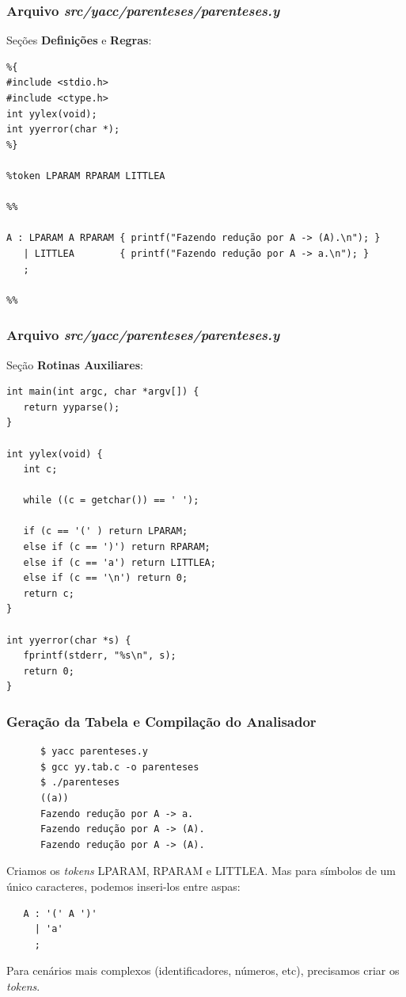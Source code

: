 \documentclass[table]{beamer}
\begin{document}
\begin{frame}[fragile]
   \frametitle{Arquivo \textit{src/yacc/parenteses/parenteses.y}}
   Seções \textbf{Definições} e \textbf{Regras}:
   \scriptsize
   \begin{verbatim}
%{
#include <stdio.h>
#include <ctype.h>
int yylex(void);
int yyerror(char *);
%}

%token LPARAM RPARAM LITTLEA

%%

A : LPARAM A RPARAM { printf("Fazendo redução por A -> (A).\n"); }
   | LITTLEA        { printf("Fazendo redução por A -> a.\n"); }
   ;

%%
   \end{verbatim}
\end{frame}

\begin{frame}[fragile]
   \frametitle{Arquivo \textit{src/yacc/parenteses/parenteses.y}}
   Seção \textbf{Rotinas Auxiliares}:
   \scriptsize
   \begin{verbatim}
int main(int argc, char *argv[]) {
   return yyparse();
}

int yylex(void) {
   int c;

   while ((c = getchar()) == ' ');

   if (c == '(' ) return LPARAM;
   else if (c == ')') return RPARAM;
   else if (c == 'a') return LITTLEA;
   else if (c == '\n') return 0; 
   return c; 
}

int yyerror(char *s) {
   fprintf(stderr, "%s\n", s);
   return 0;
}
   \end{verbatim}
\end{frame}

\begin{frame}[fragile]
   \frametitle{Geração da Tabela e Compilação do Analisador}
   \begin{verbatim}
      $ yacc parenteses.y
      $ gcc yy.tab.c -o parenteses
      $ ./parenteses
      ((a))
      Fazendo redução por A -> a.
      Fazendo redução por A -> (A).
      Fazendo redução por A -> (A).
   \end{verbatim}
   Criamos os \textit{tokens} LPARAM, RPARAM e LITTLEA. Mas para símbolos de um único caracteres, podemos inseri-los entre aspas:
   \begin{verbatim}
   A : '(' A ')'
     | 'a'
     ;
   \end{verbatim}
   Para cenários mais complexos (identificadores, números, etc), precisamos criar os \textit{tokens}.
\end{frame}
\end{document}
